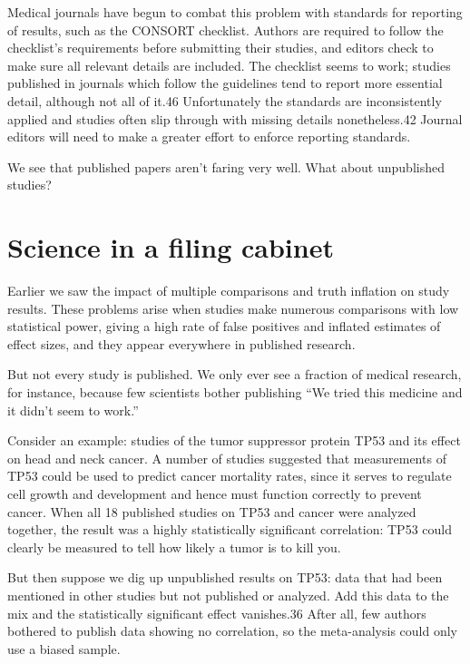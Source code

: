 Medical journals have begun to combat this problem with standards for reporting of results, such as the CONSORT checklist. Authors are required to follow the checklist’s requirements before submitting their studies, and editors check to make sure all relevant details are included. The checklist seems to work; studies published in journals which follow the guidelines tend to report more essential detail, although not all of it.46 Unfortunately the standards are inconsistently applied and studies often slip through with missing details nonetheless.42 Journal editors will need to make a greater effort to enforce reporting standards.

We see that published papers aren’t faring very well. What about unpublished studies?

\section{Science in a filing cabinet}
\label{chp10:sciencecabinet}


Earlier we saw the impact of multiple comparisons and truth inflation on study results. These problems arise when studies make numerous comparisons with low statistical power, giving a high rate of false positives and inflated estimates of effect sizes, and they appear everywhere in published research.

But not every study is published. We only ever see a fraction of medical research, for instance, because few scientists bother publishing “We tried this medicine and it didn’t seem to work.”

Consider an example: studies of the tumor suppressor protein TP53 and its effect on head and neck cancer. A number of studies suggested that measurements of TP53 could be used to predict cancer mortality rates, since it serves to regulate cell growth and development and hence must function correctly to prevent cancer. When all 18 published studies on TP53 and cancer were analyzed together, the result was a highly statistically significant correlation: TP53 could clearly be measured to tell how likely a tumor is to kill you.

But then suppose we dig up unpublished results on TP53: data that had been mentioned in other studies but not published or analyzed. Add this data to the mix and the statistically significant effect vanishes.36 After all, few authors bothered to publish data showing no correlation, so the meta-analysis could only use a biased sample.

